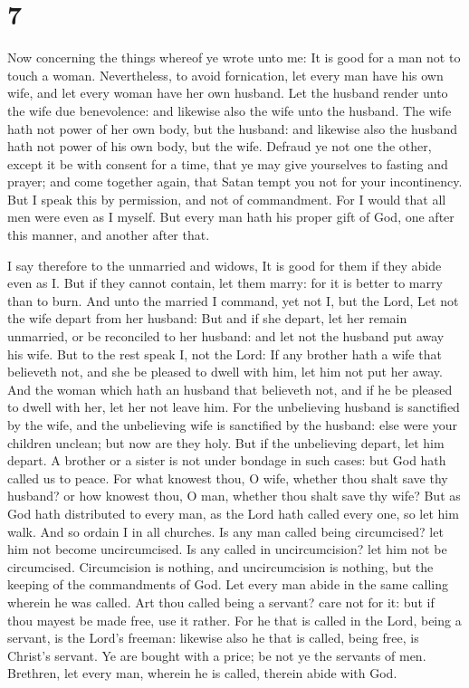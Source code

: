 \hypertarget{section-6}{%
\section{7}\label{section-6}}

 Now concerning the things whereof ye wrote unto me: It is
good for a man not to touch a woman.  Nevertheless, to avoid
fornication, let every man have his own wife, and let every woman have
her own husband.  Let the husband render unto the wife due
benevolence: and likewise also the wife unto the husband. 
The wife hath not power of her own body, but the husband: and likewise
also the husband hath not power of his own body, but the wife.
 Defraud ye not one the other, except it be with consent for
a time, that ye may give yourselves to fasting and prayer; and come
together again, that Satan tempt you not for your incontinency.
 But I speak this by permission, and not of commandment.
 For I would that all men were even as I myself. But every
man hath his proper gift of God, one after this manner, and another
after that.

 I say therefore to the unmarried and widows, It is good for
them if they abide even as I.  But if they cannot contain,
let them marry: for it is better to marry than to burn. 
And unto the married I command, yet not I, but the Lord, Let not the
wife depart from her husband:  But and if she depart, let
her remain unmarried, or be reconciled to her husband: and let not the
husband put away his wife.  But to the rest speak I, not
the Lord: If any brother hath a wife that believeth not, and she be
pleased to dwell with him, let him not put her away.  And
the woman which hath an husband that believeth not, and if he be pleased
to dwell with her, let her not leave him.  For the
unbelieving husband is sanctified by the wife, and the unbelieving wife
is sanctified by the husband: else were your children unclean; but now
are they holy.  But if the unbelieving depart, let him
depart. A brother or a sister is not under bondage in such cases: but
God hath called us to peace.  For what knowest thou, O
wife, whether thou shalt save thy husband? or how knowest thou, O man,
whether thou shalt save thy wife?  But as God hath
distributed to every man, as the Lord hath called every one, so let him
walk. And so ordain I in all churches.  Is any man called
being circumcised? let him not become uncircumcised. Is any called in
uncircumcision? let him not be circumcised.  Circumcision
is nothing, and uncircumcision is nothing, but the keeping of the
commandments of God.  Let every man abide in the same
calling wherein he was called.  Art thou called being a
servant? care not for it: but if thou mayest be made free, use it
rather.  For he that is called in the Lord, being a
servant, is the Lord's freeman: likewise also he that is called, being
free, is Christ's servant.  Ye are bought with a price; be
not ye the servants of men.  Brethren, let every man,
wherein he is called, therein abide with God.

